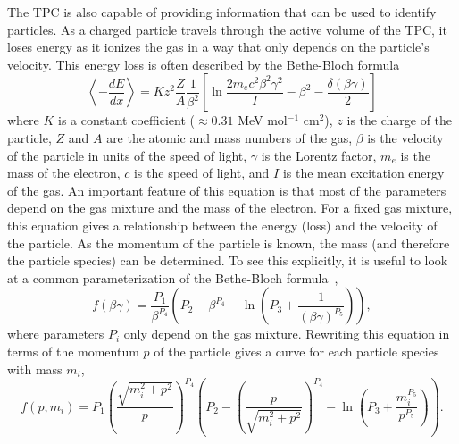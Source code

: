The TPC is also capable of providing information that can be used to identify particles. As a charged particle travels through the active volume of the TPC, it loses energy as it ionizes the gas in a way that only depends on the particle's velocity. This energy loss is often described by the Bethe-Bloch formula~\cite{BetheBlochPDG}
\begin{equation}
    \left\langle-\frac{d E}{d x}\right\rangle=K z^2 \frac{Z}{A} \frac{1}{\beta^2}\left[\ln \frac{2 m_e c^2 \beta^2 \gamma^2}{I}-\beta^2-\frac{\delta(\beta \gamma)}{2}\right]
\end{equation}
where $K$ is a constant coefficient ($\approx 0.31$ MeV mol$^{-1}$ cm$^2$), $z$ is the charge of the particle, $Z$ and $A$ are the atomic and mass numbers of the gas, $\beta$ is the velocity of the particle in units of the speed of light, $\gamma$ is the Lorentz factor, $m_e$ is the mass of the electron, $c$ is the speed of light, and $I$ is the mean excitation energy of the gas. An important feature of this equation is that most of the parameters depend on the gas mixture and the mass of the electron. For a fixed gas mixture, this equation gives a relationship between the energy (loss) and the velocity of the particle. As the momentum of the particle is known, the mass (and therefore the particle species) can be determined. To see this explicitly, it is useful to look at a common parameterization of the Bethe-Bloch formula~\cite{BetheBlochALEPH},
\begin{equation}
    f(\beta \gamma)=\frac{P_1}{\beta^{P_4}}\left(P_2-\beta^{P_4}-\ln \left(P_3+\frac{1}{(\beta \gamma)^{P_5}}\right)\right),
\end{equation}
where parameters $P_i$ only depend on the gas mixture. Rewriting this equation in terms of the momentum $p$ of the particle gives a curve for each particle species with mass $m_i$,
\begin{equation}
    \label{eq:bethe_bloch_par}
    f(p, m_i)= P_1 \left(\frac{\sqrt{m_i^2 + p^2}}{p}\right)^{P_4} \left(P_2 - \left(\frac{p}{\sqrt{m_i^2 + p^2}}\right)^{P_4}  - \ln \left(P_3 + \frac{m_i^{P_5}}{p^{P_5}} \right) \right).
\end{equation}

